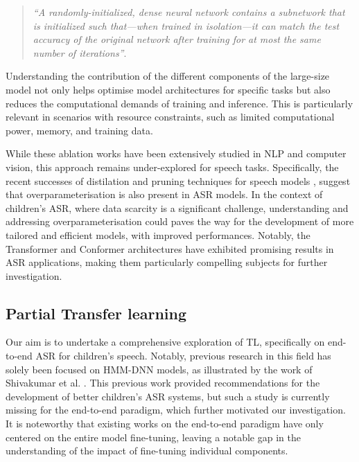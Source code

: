\begin{quote}
    \textit{``A randomly-initialized, dense neural network contains a subnetwork that is initialized such that—when trained in isolation—it can match the test accuracy of the original network after training for at most the same number of iterations''}.
\end{quote}

Understanding the contribution of the different components of the large-size model not only helps optimise model architectures for specific tasks but also reduces the computational demands of training and inference. This is particularly relevant in scenarios with resource constraints, such as limited computational power, memory, and training data. 


While these ablation works have been extensively studied in NLP and computer vision, this approach remains under-explored for speech tasks. Specifically, the recent successes of distilation and pruning techniques for speech models \cite{gandhi2023distilwhisper,chang2022distilhubert,peng23c_interspeech}, suggest that overparameterisation is also present in \ac{ASR} models. In the context of children's \ac{ASR}, where data scarcity is a significant challenge, understanding and addressing overparameterisation could paves the way for the development of more tailored and efficient models, with improved performances. Notably, the Transformer and Conformer architectures have exhibited promising results in \ac{ASR} applications, making them particularly compelling subjects for further investigation.


\subsection{Partial Transfer learning}

Our aim is to undertake a comprehensive exploration of \ac{TL}, specifically on end-to-end \ac{ASR} for children's speech. Notably, previous research in this field has solely been focused on \ac{HMM-DNN} models, as illustrated by the work of Shivakumar et al. \cite{shivakumar2020transfer}. This previous work provided recommendations for the development of better children's \ac{ASR} systems, but such a study is currently missing for the end-to-end paradigm, which  further motivated our investigation. It is noteworthy that existing works on the end-to-end paradigm have only centered on the entire model fine-tuning, leaving a notable gap in the understanding of the impact of fine-tuning individual components.

